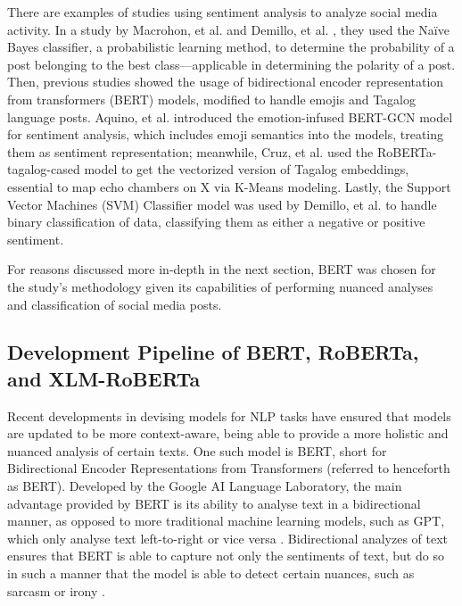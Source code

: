 There are examples of studies using sentiment analysis to analyze social media activity. In a study by Macrohon, et al. \cite{Macrohon-2022} and Demillo, et al. \cite{Demillo-2023}, they used the Naïve Bayes classifier, a probabilistic learning method, to determine the probability of a post belonging to the best class—applicable in determining the polarity of a post. Then, previous studies showed the usage of bidirectional encoder representation from transformers (BERT) models, modified to handle emojis and Tagalog language posts. Aquino, et al. \cite{Aquino-2025} introduced the emotion-infused BERT-GCN model for sentiment analysis, which includes emoji semantics into the models, treating them as sentiment representation; meanwhile, Cruz, et al. \cite{Cruz-2022} used the RoBERTa-tagalog-cased model to get the vectorized version of Tagalog embeddings, essential to map echo chambers on X via K-Means modeling. Lastly, the Support Vector Machines (SVM) Classifier model was used by Demillo, et al. \cite{Demillo-2023} to handle binary classification of data, classifying them as either a negative or positive sentiment.

For reasons discussed more in-depth in the next section, BERT was chosen for the study’s methodology given its capabilities of performing nuanced analyses and classification of social media posts.

\subsection{Development Pipeline of BERT, RoBERTa, and XLM-RoBERTa}
Recent developments in devising models for NLP tasks have ensured that models are updated to be more context-aware, being able to provide a more holistic and nuanced analysis of certain texts. One such model is BERT, short for Bidirectional Encoder Representations from Transformers (referred to henceforth as BERT). Developed by the Google AI Language Laboratory, the main advantage provided by BERT is its ability to analyse text in a bidirectional manner, as opposed to more traditional machine learning models, such as GPT, which only analyse text left-to-right or vice versa \cite{Koroteev-2021}. Bidirectional analyzes of text ensures that BERT is able to capture not only the sentiments of text, but do so in such a manner that the model is able to detect certain nuances, such as sarcasm or irony \cite{Dong-2020}.

